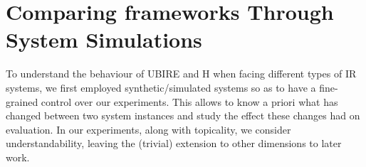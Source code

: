 



\section{Comparing frameworks Through System Simulations}
\label{sec:simulations}


To understand the behaviour of UBIRE and H when facing different types of IR systems, we first employed synthetic/simulated systems so as to have a fine-grained control over our experiments. This allows to know a priori what has changed between two system instances and study the effect these changes had on evaluation. In our experiments, along with topicality, we consider understandability, leaving the (trivial) extension to other dimensions to later work. %




%

